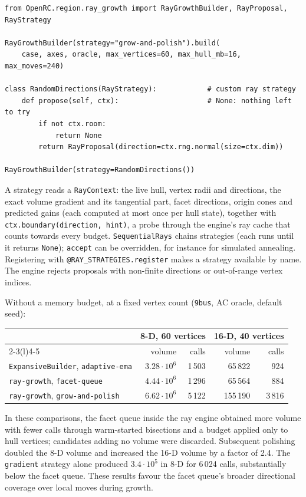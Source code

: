 \documentclass[11pt,a4paper]{report}
\newcommand{\code}[1]{\texttt{\small #1}}
\begin{document}
\begin{lstlisting}
from OpenRC.region.ray_growth import RayGrowthBuilder, RayProposal, RayStrategy

RayGrowthBuilder(strategy="grow-and-polish").build(
    case, axes, oracle, max_vertices=60, max_hull_mb=16, max_moves=240)

class RandomDirections(RayStrategy):            # custom ray strategy
    def propose(self, ctx):                     # None: nothing left to try
        if not ctx.room:
            return None
        return RayProposal(direction=ctx.rng.normal(size=ctx.dim))

RayGrowthBuilder(strategy=RandomDirections())
\end{lstlisting}

A strategy reads a \code{RayContext}: the live hull, vertex radii and
directions, the exact volume gradient and its tangential part, facet
directions, origin cones and predicted gains (each computed at most once per
hull state), together with \code{ctx.boundary(direction, hint)}, a probe through the
engine's ray cache that counts towards every budget. \code{SequentialRays}
chains strategies (each runs until it returns \code{None}); \code{accept} can
be overridden, for instance for simulated annealing. Registering with
\code{@RAY\_STRATEGIES.register} makes a strategy available by name. The engine
rejects proposals with non-finite directions or out-of-range vertex indices.

Without a memory budget, at a fixed vertex count (\code{9bus}, AC oracle,
default seed):

\begin{center}\small
\begin{tabular}{@{}lrrrr@{}}
\toprule
& \multicolumn{2}{c}{8-D, 60 vertices} & \multicolumn{2}{c}{16-D, 40 vertices} \\
\cmidrule(lr){2-3}\cmidrule(l){4-5}
& volume & calls & volume & calls \\
\midrule
\code{ExpansiveBuilder}, \code{adaptive-ema} & $3.28\cdot10^6$ & 1\,503 & 65\,822 & 924 \\
\code{ray-growth}, \code{facet-queue}         & $4.44\cdot10^6$ & 1\,296 & 65\,564 & 884 \\
\code{ray-growth}, \code{grow-and-polish}     & $6.62\cdot10^6$ & 5\,122 & 155\,190 & 3\,816 \\
\bottomrule
\end{tabular}
\end{center}

In these comparisons, the facet queue inside the ray engine obtained more
volume with fewer calls through warm-started bisections and a budget applied
only to hull vertices; candidates adding no volume were discarded. Subsequent
polishing doubled the 8-D volume and increased the 16-D volume by a factor of
2.4. The \code{gradient} strategy alone produced $3.4\cdot10^5$ in 8-D for
6\,024 calls, substantially below the facet queue. These results favour the
facet queue's broader directional coverage over local moves during growth.
\end{document}

